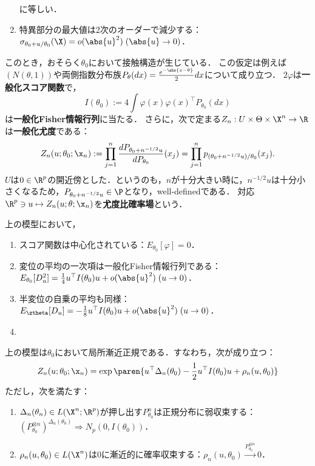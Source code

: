 \documentclass[uplatex,dvipdfmx]{jsreport}
\begin{document}
\begin{model}[局所漸近正規なモデル]
\begin{enumerate}[({G}1)]
        に等しい．
        \item 特異部分の最大値は2次のオーダーで減少する：$\sigma_{\theta_0+u/\theta_0}(\X)=o(\abs{u}^2)\;(\abs{u}\to0)$．
    \end{enumerate}
    このとき，おそらく$\theta_0$において接触構造が生じている．
    この仮定は例えば$(N(\theta,1))$や両側指数分布族$P_\theta(dx)=\frac{e^{-\abs{x-\theta}}}{2}dx$について成り立つ．
    $2\varphi$は\textbf{一般化スコア関数}で，
    \[I(\theta_0):=4\int\varphi(x)\varphi(x)^{\top}P_{\theta_0}(dx)\]
    は\textbf{一般化Fisher情報行列}に当たる．
    さらに，次で定まる$Z_n:U\times \Theta\times\X^n\to\R$は\textbf{一般化尤度}である：
    \[Z_n(u;\theta_0;\x_n):=\prod^n_{j=1}\frac{dP_{\theta_0+n^{-1/2}u}}{dP_{\theta_0}}(x_j)=\prod^n_{j=1}p_{(\theta_0+n^{-1/2}u)/\theta_0}(x_j).\]
    $U$は$0\in\R^p$の開近傍とした．というのも，$n$が十分大きい時に，$n^{-1/2}u$は十分小さくなるため，$P_{\theta_0+n^{-1/2}u}\in\P$となり，well-definedである．
    対応$\R^p\ni u\mapsto Z_n(u;\theta;\x_n)$を\textbf{尤度比確率場}という．
\end{model}

\begin{lemma}
    上の模型において，
    \begin{enumerate}
        \item スコア関数は中心化されている：$E_{\theta_0}[\varphi]=0$．
        \item 変位の平均の一次項は一般化Fisher情報行列である：$E_{\theta_0}[D^2_u]=\frac{1}{4}u^{\top}I(\theta_0)u+o(\abs{u}^2)\;(u\to0)$．
        \item 半変位の自乗の平均も同様：$E_{\ztheta}[D_u]=-\frac{1}{8}u^\top I(\theta_0)u+o(\abs{u}^2)\;(u\to0)$．
        \item 
    \end{enumerate}
\end{lemma}

\begin{theorem}\label{thm-LAN-of-model}
    上の模型は$\theta_0$において局所漸近正規である．すなわち，次が成り立つ：
    \[Z_n(u;\theta_0;\x_n)=\exp\paren{u^\top\Delta_n(\theta_0)-\frac{1}{2}u^\top I(\theta_0)u+\rho_n(u,\theta_0)}\]
    ただし，次を満たす：
    \begin{enumerate}
        \item $\Delta_n(\theta_n)\in L(\X^n;\R^p)$が押し出す$P^{n}_{\theta_0}$は正規分布に弱収束する：
        $(P^{\otimes n}_{\theta_0})^{\Delta_n(\theta_0)}\Rightarrow N_p(0,I(\theta_0))$．
        \item $\rho_n(u,\theta_0)\in L(\X^n)$は$0$に漸近的に確率収束する：$\rho_n(u,\theta_0)\xrightarrow{P_{\theta_0}^{\otimes n}}0$．
    \end{enumerate}
\end{theorem}
\end{document}
